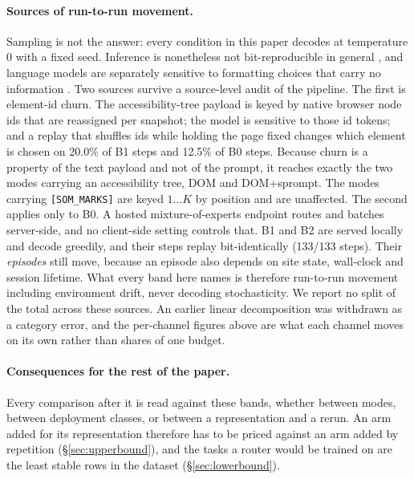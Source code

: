  \paragraph{Sources of run-to-run movement.} Sampling is not the answer: every condition in this paper decodes at temperature $0$ with a fixed seed. Inference is nonetheless not bit-reproducible in general \citep{he2025nondeterminism,yuan2025numerical}, and language models are separately sensitive to formatting choices that carry no information \citep{sclar2024promptformat}. Two sources survive a source-level audit of the pipeline. The first is element-id churn. The accessibility-tree payload is keyed by native browser node ids that are reassigned per snapshot; the model is sensitive to those id tokens; and a replay that shuffles ids while holding the page fixed changes which element is chosen on 20.0\% of B1 steps and 12.5\% of B0 steps. Because churn is a property of the text payload and not of the prompt, it reaches exactly the two modes carrying an accessibility tree, DOM and DOM+sprompt. The modes carrying \texttt{[SOM\_MARKS]} are keyed $1\ldots K$ by position and are unaffected. The second applies only to B0. A hosted mixture-of-experts endpoint routes and batches server-side, and no client-side setting controls that. B1 and B2 are served locally and decode greedily, and their steps replay bit-identically (133/133 steps). Their \emph{episodes} still move, because an episode also depends on site state, wall-clock and session lifetime. What every band here names is therefore run-to-run movement including environment drift, never decoding stochasticity. We report no split of the total across these sources. An earlier linear decomposition was withdrawn as a category error, and the per-channel figures above are what each channel moves on its own rather than shares of one budget.

\paragraph{Consequences for the rest of the paper.} Every comparison after it is read against these bands, whether between modes, between deployment classes, or between a representation and a rerun. An arm added for its representation therefore has to be priced against an arm added by repetition (\S\ref{sec:upperbound}), and the tasks a router would be trained on are the least stable rows in the dataset (\S\ref{sec:lowerbound}).

